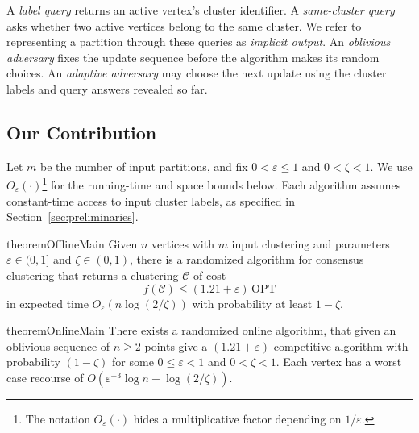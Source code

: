 \documentclass[11pt]{article}
\newcommand{\kushagra}[1]{\todo[color=yellow, inline]{kushagra: #1}}
\newcommand{\clustering}{clustering\xspace}
\newcommand{\cost}{f}
\newcommand{\cls}[1]{\mathcal{#1}} %
\begin{document}
A \emph{label query} returns an active vertex's cluster identifier. A
\emph{same-cluster query} asks whether two active vertices belong to the
same cluster. We refer to representing a partition through these queries
as \emph{implicit output}. An \emph{oblivious adversary} fixes the update
sequence before the algorithm makes its random choices. An
\emph{adaptive adversary} may choose the next update using the cluster
labels and query answers revealed so far.

\subsection{Our Contribution}

Let $m$ be the number of input partitions, and fix
$0<\varepsilon\le1$ and $0<\zeta<1$. We use
$O_\varepsilon(\cdot)$\footnote{The notation $O_\varepsilon(\cdot)$
hides a multiplicative factor depending on $1/\varepsilon$.}
for the running-time and space bounds below. Each algorithm assumes constant-time access
to input cluster labels,
as specified in Section~\ref{sec:preliminaries}.

\begin{restatable}{theorem}{OfflineMain}
\label{off:linear}
Given $n$ vertices with $m$ input \clustering and parameters
$\varepsilon\in(0,1]$ and $\zeta\in(0,1)$, there is a randomized algorithm
for consensus clustering that returns a \clustering{} $\cls{C}$ of cost
\[
    \cost(\cls{C}) \le (1.21+\varepsilon)\,\mathrm{OPT}
\]
in expected time $O_{\varepsilon}(n\log(2/\zeta))$ with probability at least $1-\zeta$.
\end{restatable}

\begin{restatable}{theorem}{OnlineMain}
\label{on:loglog}
    There exists a randomized online algorithm, that given an oblivious sequence of $n \geq 2$ points give a $(1.21 + \varepsilon)$ competitive algorithm with probability $(1 - \zeta)$ for some $0 \leq \varepsilon < 1$ and $0 < \zeta < 1 $. Each vertex has a worst case recourse of $O(\varepsilon^{-3}\log n+\log(2/\zeta))$.
\end{restatable}

\end{document}
